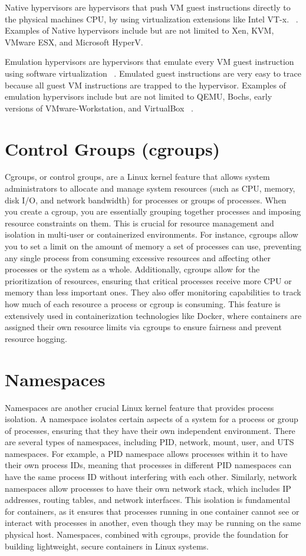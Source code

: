 \documentclass[12pt]{report}
\begin{document}
\begin{doublespace}
Native hypervisors are hypervisors that push VM guest instructions directly to the physical machines CPU, by using virtualization extensions like Intel VT-x. ~\cite{10.1145/2775111}. Examples of Native hypervisors include but are not limited to Xen, KVM, VMware ESX, and Microsoft HyperV.

Emulation hypervisors are hypervisors that emulate every VM guest instruction using software virtualization ~\cite{10.1145/2775111}. Emulated guest instructions are very easy to trace because all guest VM instructions are trapped to the hypervisor. Examples of emulation hypervisors include but are not limited to QEMU, Bochs, early versions of VMware-Workstation, and VirtualBox ~\cite{10.1145/2775111}.


\section{Control Groups (cgroups)}
Cgroups, or control groups, are a Linux kernel feature that allows system administrators to allocate and manage system resources (such as CPU, memory, disk I/O, and network bandwidth) for processes or groups of processes. When you create a cgroup, you are essentially grouping together processes and imposing resource constraints on them. This is crucial for resource management and isolation in multi-user or containerized environments. For instance, cgroups allow you to set a limit on the amount of memory a set of processes can use, preventing any single process from consuming excessive resources and affecting other processes or the system as a whole. Additionally, cgroups allow for the prioritization of resources, ensuring that critical processes receive more CPU or memory than less important ones. They also offer monitoring capabilities to track how much of each resource a process or cgroup is consuming. This feature is extensively used in containerization technologies like Docker, where containers are assigned their own resource limits via cgroups to ensure fairness and prevent resource hogging.

\section{Namespaces}
Namespaces are another crucial Linux kernel feature that provides process isolation. A namespace isolates certain aspects of a system for a process or group of processes, ensuring that they have their own independent environment. There are several types of namespaces, including PID, network, mount, user, and UTS namespaces. For example, a PID namespace allows processes within it to have their own process IDs, meaning that processes in different PID namespaces can have the same process ID without interfering with each other. Similarly, network namespaces allow processes to have their own network stack, which includes IP addresses, routing tables, and network interfaces. This isolation is fundamental for containers, as it ensures that processes running in one container cannot see or interact with processes in another, even though they may be running on the same physical host. Namespaces, combined with cgroups, provide the foundation for building lightweight, secure containers in Linux systems.


\end{doublespace}
\end{document}
